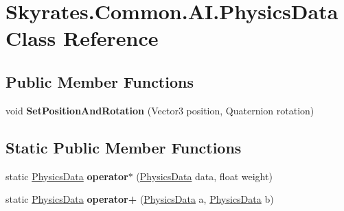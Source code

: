 \hypertarget{class_skyrates_1_1_common_1_1_a_i_1_1_physics_data}{\section{Skyrates.\-Common.\-A\-I.\-Physics\-Data Class Reference}
\label{class_skyrates_1_1_common_1_1_a_i_1_1_physics_data}
}
\subsection*{Public Member Functions}
\begin{DoxyCompactItemize}
\item 
\hypertarget{class_skyrates_1_1_common_1_1_a_i_1_1_physics_data_aa83649b0c60ae9091119d4504580dcf7}{void {\bfseries Set\-Position\-And\-Rotation} (Vector3 position, Quaternion rotation)}\label{class_skyrates_1_1_common_1_1_a_i_1_1_physics_data_aa83649b0c60ae9091119d4504580dcf7}

\end{DoxyCompactItemize}
\subsection*{Static Public Member Functions}
\begin{DoxyCompactItemize}
\item 
\hypertarget{class_skyrates_1_1_common_1_1_a_i_1_1_physics_data_a72917f7c9ec37a78a54e4b0594bb2180}{static \hyperlink{class_skyrates_1_1_common_1_1_a_i_1_1_physics_data}{Physics\-Data} {\bfseries operator$\ast$} (\hyperlink{class_skyrates_1_1_common_1_1_a_i_1_1_physics_data}{Physics\-Data} data, float weight)}\label{class_skyrates_1_1_common_1_1_a_i_1_1_physics_data_a72917f7c9ec37a78a54e4b0594bb2180}

\item 
\hypertarget{class_skyrates_1_1_common_1_1_a_i_1_1_physics_data_aa7f9c5ee9578429c49e6219f4893cb3b}{static \hyperlink{class_skyrates_1_1_common_1_1_a_i_1_1_physics_data}{Physics\-Data} {\bfseries operator+} (\hyperlink{class_skyrates_1_1_common_1_1_a_i_1_1_physics_data}{Physics\-Data} a, \hyperlink{class_skyrates_1_1_common_1_1_a_i_1_1_physics_data}{Physics\-Data} b)}\label{class_skyrates_1_1_common_1_1_a_i_1_1_physics_data_aa7f9c5ee9578429c49e6219f4893cb3b}

\end{DoxyCompactItemize}
